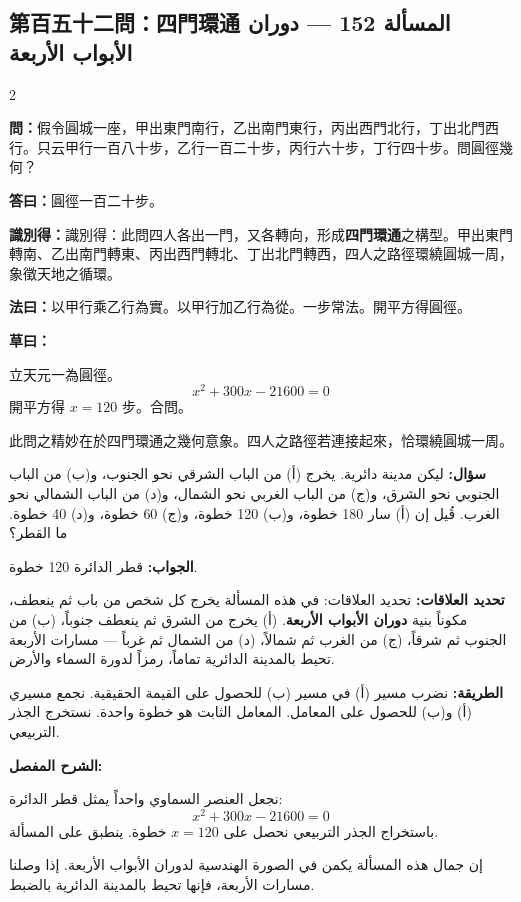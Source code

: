\documentclass[11pt,a4paper]{article}
\newcommand{\ar}[1]{\arabicfont\beginR #1\endR}
\newcommand{\arb}[1]{\textbf{\arabicfont\beginR #1\endR}}
\newcommand{\arnote}[1]{\textcolor{arabicblue}{\ar{#1}}}
\newcommand{\wen}[1]{\par\noindent\textbf{\textcolor{probcolor}{問：}}{#1}\par}
\newcommand{\da}[1]{\par\noindent\textbf{\textcolor{anscolor}{答曰：}}{#1}\par}
\newcommand{\fayue}[1]{\par\noindent\textbf{\textcolor{methodcolor}{法曰：}}{#1}\par}
\newcommand{\caoyue}[1]{\par\noindent\textbf{草曰：}{#1}\par}
\newcommand{\zhi}[1]{\par\noindent\textbf{識別得：}{#1}\par}
\newcommand{\arwen}[1]{\par\noindent\arb{سؤال: }\arnote{#1}\par}
\newcommand{\arjwb}[1]{\par\noindent\arb{الجواب: }\arnote{#1}\par}
\newcommand{\arqwd}[1]{\par\noindent\arb{الطريقة: }\arnote{#1}\par}
\newcommand{\arshr}[1]{\par\noindent\arb{الشرح المفصل: }\arnote{#1}\par}
\newcommand{\arfl}[1]{\par\noindent\arb{تحديد العلاقات: }\arnote{#1}\par}
\begin{document}
\subsection*{第百五十二問：四門環通 \hfill \ar{المسألة 152 — دوران الأبواب الأربعة}}

\begin{paracol}{2}

\begin{leftcolumn}
\wen{假令圓城一座，甲出東門南行，乙出南門東行，丙出西門北行，丁出北門西行。只云甲行一百八十步，乙行一百二十步，丙行六十步，丁行四十步。問圓徑幾何？}

\da{圓徑一百二十步。}

\zhi{識別得：此問四人各出一門，又各轉向，形成\textbf{四門環通}之構型。甲出東門轉南、乙出南門轉東、丙出西門轉北、丁出北門轉西，四人之路徑環繞圓城一周，象徵天地之循環。}

\fayue{以甲行乘乙行為實。以甲行加乙行為從。一步常法。開平方得圓徑。}

\caoyue{
立天元一為圓徑。
$$x^2 + 300x - 21600 = 0$$
開平方得 $x = 120$ 步。合問。

此問之精妙在於四門環通之幾何意象。四人之路徑若連接起來，恰環繞圓城一周。}
\end{leftcolumn}

\begin{rightcolumn}
\arwen{ليكن مدينة دائرية. يخرج (أ) من الباب الشرقي نحو الجنوب، و(ب) من الباب الجنوبي نحو الشرق، و(ج) من الباب الغربي نحو الشمال، و(د) من الباب الشمالي نحو الغرب. قُيل إن (أ) سار 180 خطوة، و(ب) 120 خطوة، و(ج) 60 خطوة، و(د) 40 خطوة. ما القطر؟}

\arjwb{قطر الدائرة 120 خطوة.}

\arfl{تحديد العلاقات: في هذه المسألة يخرج كل شخص من باب ثم ينعطف، مكوناً بنية \textbf{دوران الأبواب الأربعة}. (أ) يخرج من الشرق ثم ينعطف جنوباً، (ب) من الجنوب ثم شرقاً، (ج) من الغرب ثم شمالاً، (د) من الشمال ثم غرباً — مسارات الأربعة تحيط بالمدينة الدائرية تماماً، رمزاً لدورة السماء والأرض.}

\arqwd{نضرب مسير (أ) في مسير (ب) للحصول على القيمة الحقيقية. نجمع مسيري (أ) و(ب) للحصول على المعامل. المعامل الثابت هو خطوة واحدة. نستخرج الجذر التربيعي.}

\arshr{نجعل العنصر السماوي واحداً يمثل قطر الدائرة:
$$x^2 + 300x - 21600 = 0$$
باستخراج الجذر التربيعي نحصل على $x = 120$ خطوة. ينطبق على المسألة.

إن جمال هذه المسألة يكمن في الصورة الهندسية لدوران الأبواب الأربعة. إذا وصلنا مسارات الأربعة، فإنها تحيط بالمدينة الدائرية بالضبط.}
\end{rightcolumn}

\end{paracol}
\end{document}
